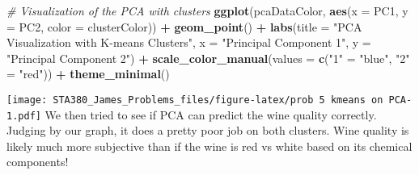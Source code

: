 \documentclass[
]{article}
\newenvironment{Shaded}{\begin{snugshade}}{\end{snugshade}}
\newcommand{\AttributeTok}[1]{\textcolor[rgb]{0.13,0.29,0.53}{#1}}
\newcommand{\CommentTok}[1]{\textcolor[rgb]{0.56,0.35,0.01}{\textit{#1}}}
\newcommand{\DecValTok}[1]{\textcolor[rgb]{0.00,0.00,0.81}{#1}}
\newcommand{\FunctionTok}[1]{\textcolor[rgb]{0.13,0.29,0.53}{\textbf{#1}}}
\newcommand{\NormalTok}[1]{#1}
\newcommand{\OtherTok}[1]{\textcolor[rgb]{0.56,0.35,0.01}{#1}}
\newcommand{\SpecialCharTok}[1]{\textcolor[rgb]{0.81,0.36,0.00}{\textbf{#1}}}
\newcommand{\StringTok}[1]{\textcolor[rgb]{0.31,0.60,0.02}{#1}}
\begin{document}
\begin{Shaded}
\begin{Highlighting}[]
\CommentTok{\# Visualization of the PCA with clusters}
\FunctionTok{ggplot}\NormalTok{(pcaDataColor, }\FunctionTok{aes}\NormalTok{(}\AttributeTok{x =}\NormalTok{ PC1, }\AttributeTok{y =}\NormalTok{ PC2, }\AttributeTok{color =}\NormalTok{ clusterColor)) }\SpecialCharTok{+}
  \FunctionTok{geom\_point}\NormalTok{() }\SpecialCharTok{+}
  \FunctionTok{labs}\NormalTok{(}\AttributeTok{title =} \StringTok{"PCA Visualization with K{-}means Clusters"}\NormalTok{, }\AttributeTok{x =} \StringTok{"Principal Component 1"}\NormalTok{, }\AttributeTok{y =} \StringTok{"Principal Component 2"}\NormalTok{) }\SpecialCharTok{+}
  \FunctionTok{scale\_color\_manual}\NormalTok{(}\AttributeTok{values =} \FunctionTok{c}\NormalTok{(}\StringTok{"1"} \OtherTok{=} \StringTok{"blue"}\NormalTok{, }\StringTok{"2"} \OtherTok{=} \StringTok{"red"}\NormalTok{)) }\SpecialCharTok{+}
  \FunctionTok{theme\_minimal}\NormalTok{()}
\end{Highlighting}
\end{Shaded}

\texttt{[image: STA380\_James\_Problems\_files/figure-latex/prob 5 kmeans on PCA-1.pdf]}
We then tried to see if PCA can predict the wine quality correctly.
Judging by our graph, it does a pretty poor job on both clusters. Wine
quality is likely much more subjective than if the wine is red vs white
based on its chemical components!

\begin{Shaded}
\end{Shaded}
\end{document}
